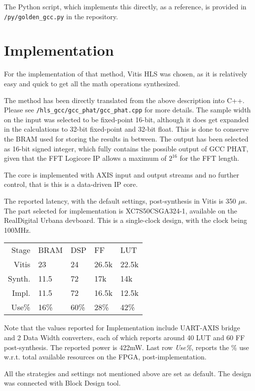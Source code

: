 \documentclass[a4paper,twocolumn]{article}
\begin{document}
The Python script, which implements this directly, as a reference, is
provided in \texttt{/py/golden\_gcc.py} in the repository.

\section{Implementation}

For the implementation of that method, Vitis HLS was chosen, as it is
relatively easy and quick to get all the math operations synthesized.

The method has been directly translated from the above description
into C++. Please see \texttt{/hls\_gcc/gcc\_phat/gcc\_phat.cpp} for
more details. The sample width on the input was selected to be
fixed-point 16-bit, although it does get expanded in the calculations
to 32-bit fixed-point and 32-bit float. This is done to conserve the
BRAM used for storing the results in between. The output has been
selected as 16-bit signed integer, which fully contains the possible
output of GCC PHAT, given that the FFT Logicore IP\cite{xfft} allows a
maximum of $2^{16}$ for the FFT length.

The core is implemented with AXIS input and output streams and no
further control, that is this is a data-driven IP core. 

The reported latency, with the default settings, post-synthesis
in Vitis is 350 $\mu$s. The part selected for implementation is
XC7S50CSGA324-1, available on the RealDigital Urbana devboard.
This is a single-clock design, with the clock being 100MHz.

\begin{tabular}{r|l|l|l|l}
  Stage & BRAM & DSP & FF & LUT \\
  Vitis & 23 & 24 & 26.5k & 22.5k \\
  Synth. & 11.5 & 72 & 17k & 14k \\
  Impl. & 11.5 & 72 & 16.5k & 12.5k \\
  Use\% & 16\% & 60\% & 28\% & 42\%
\end{tabular}

Note that the values reported for Implementation include UART-AXIS
bridge and 2 Data Width converters, each of which reports around 40
LUT and 60 FF post-synthesis. The reported power is 422mW. Last row
\emph{Use\%}, reports the \% use w.r.t. total available resources on
the FPGA, post-implementation.

All the strategies and settings not mentioned above are set as
default. The design was connected with Block Design tool.
\end{document}
